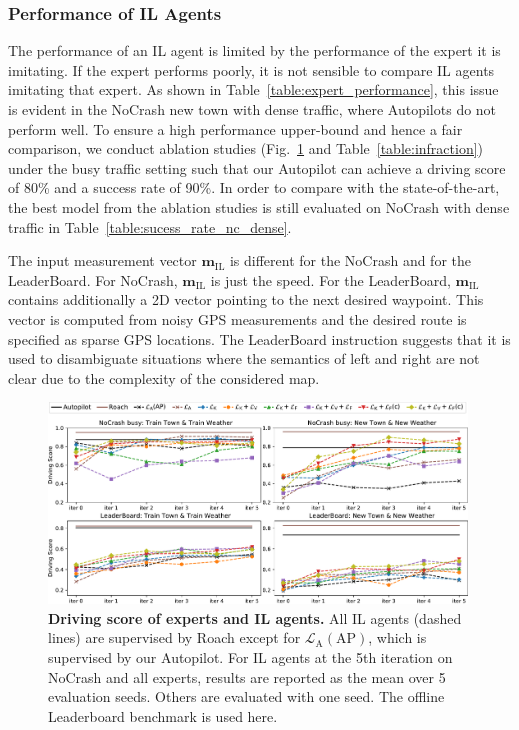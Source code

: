 \subsubsection{Performance of IL Agents}

The performance of an IL agent is limited by the performance of the expert it is imitating.
If the expert performs poorly, it is not sensible to compare IL agents imitating that expert.
As shown in Table~\ref{table:expert_performance}, this issue is evident in the NoCrash new town with dense traffic, where Autopilots do not perform well. 
To ensure a high performance upper-bound and hence a fair comparison, we conduct ablation studies (Fig.~\ref{fig:score_eu_lb_tt_tn} and Table~\ref{table:infraction}) under the busy traffic setting such that our Autopilot can achieve a driving score of 80\% and a success rate of 90\%. 
In order to compare with the state-of-the-art, the best model from the ablation studies is still evaluated on NoCrash with dense traffic in Table~\ref{table:sucess_rate_nc_dense}.


The input measurement vector $\mathbf{m}_\text{IL}$ is different for the NoCrash and for the LeaderBoard. 
For NoCrash, $\mathbf{m}_\text{IL}$ is just the speed.
For the LeaderBoard, $\mathbf{m}_\text{IL}$ contains additionally a 2D vector pointing to the next desired waypoint.
This vector is computed from noisy GPS measurements and the desired route is specified as sparse GPS locations.
The LeaderBoard instruction suggests that it is used to disambiguate situations where the semantics of left and right are not clear due to the complexity of the considered map.

\begin{figure}[t]
	\centering
	\includegraphics[width=0.99\textwidth]{img/score_eu_lb_tt_tn.pdf}
	\vspace{-1ex}
	\caption{\textbf{Driving score of experts and IL agents.} 
		All IL agents (dashed lines) are supervised by Roach except for $\mathcal{L}_\text{A}(\text{AP})$, which is supervised by our Autopilot. 
		For IL agents at the 5th iteration on NoCrash and all experts, results are reported as the mean over 5 evaluation seeds. 
		Others are evaluated with one seed. 
		The offline Leaderboard benchmark is used here.}
	\vspace{-1.5ex}
	\label{fig:score_eu_lb_tt_tn}
\end{figure}


